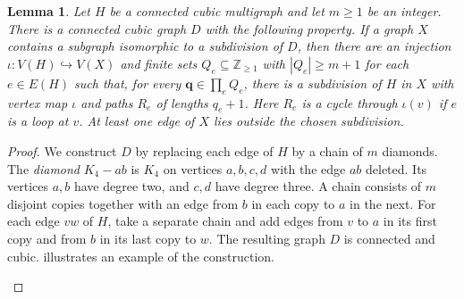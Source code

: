\documentclass[11pt,a4paper]{article}
\theoremstyle{plain}
\newtheorem{lemma}[theorem]{Lemma}
\theoremstyle{definition}
\newcommand{\Z}{\mathbb{Z}}
\begin{document}
\begin{lemma}\label{lem:independent-path-lengths}
 Let $H$ be a connected cubic multigraph and let $m\geq1$ be an integer.
 There is a connected cubic graph $D$ with the following property.
 If a graph $X$ contains a subgraph isomorphic to a subdivision of $D$,
 then there are an injection $\iota:V(H)\hookrightarrow V(X)$ and finite
 sets $Q_e\subseteq\Z_{\geq1}$ with $|Q_e|\geq m+1$ for each $e\in E(H)$
 such that, for every $\mathbf q\in\prod_eQ_e$, there is a subdivision
 of $H$ in $X$ with vertex map $\iota$ and paths $R_e$ of lengths $q_e+1$.
 Here $R_e$ is a cycle through $\iota(v)$ if $e$ is a loop at $v$.
 At least one edge of $X$ lies outside the chosen subdivision.
\end{lemma}
\begin{proof}
We construct $D$ by replacing each edge of $H$ by a chain of $m$ diamonds.
The \emph{diamond} $K_4-ab$ is $K_4$ on vertices $a,b,c,d$ with the
edge $ab$ deleted. Its vertices $a,b$ have degree two, and $c,d$ have
degree three. A chain consists of $m$ disjoint copies together with
an edge from $b$ in each copy to $a$ in the next.
For each edge $vw$ of $H$, take a separate chain and add edges from
$v$ to $a$ in its first copy and from $b$ in its last copy to $w$.
The resulting graph $D$ is connected and cubic.
 illustrates an example of the construction.
\begin{figure}[tb]
\centering
{}
\end{figure}
\end{proof}
\end{document}

